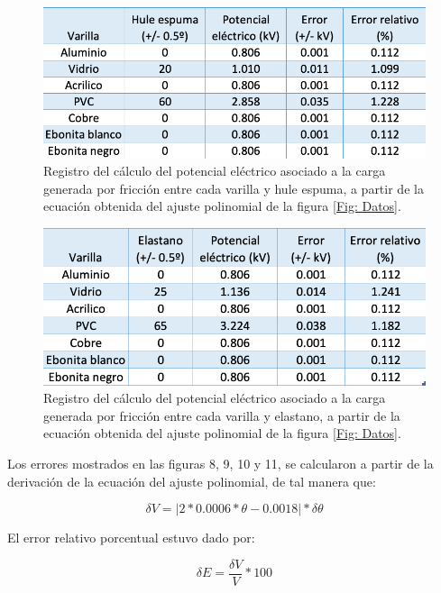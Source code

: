 \documentclass[10pt,journal]{IEEEtran}
\begin{document}
\begin{figure}[H]
\centering
\includegraphics[scale=0.30]{huleespuma.png}
\caption{Registro del cálculo del potencial eléctrico asociado a la carga generada por fricción entre cada varilla y hule espuma, a partir de la ecuación obtenida del ajuste polinomial de la figura \ref{Fig: Datos}.}
\end{figure}

\begin{figure}[H]
\centering
\includegraphics[scale=0.30]{elastano.png}
\caption{Registro del cálculo del potencial eléctrico asociado a la carga generada por fricción entre cada varilla y elastano, a partir de la ecuación obtenida del ajuste polinomial de la figura \ref{Fig: Datos}.}
\end{figure}

Los errores mostrados en las figuras 8, 9, 10 y 11, se calcularon a partir de la derivación de la ecuación del ajuste polinomial, de tal manera que:

\begin{equation*}
    \delta V = |2*0.0006*\theta -0.0018|*\delta\theta
\end{equation*}


El error relativo porcentual estuvo dado por:

\begin{equation*}
    \delta E = \frac{\delta V}{V}*100
\end{equation*}\\
\end{document}

